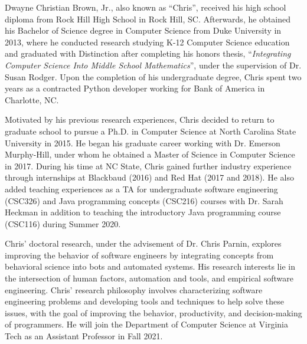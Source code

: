 \begin{biography}
Dwayne Christian Brown, Jr., also known as ``Chris'', received his high school diploma from Rock Hill High School in Rock Hill, SC. Afterwards, he obtained his Bachelor of Science degree in Computer Science from Duke University in 2013, where he conducted research studying K-12 Computer Science education and graduated with Distinction after completing his honors thesis, ``\textit{Integrating Computer Science Into Middle School Mathematics}'', under the supervision of Dr. Susan Rodger. Upon the completion of his undergraduate degree, Chris spent two years as a contracted Python developer working for Bank of America in Charlotte, NC. 

Motivated by his previous research experiences, Chris decided to return to graduate school to pursue a Ph.D. in Computer Science at North Carolina State University in 2015. He began his graduate career working with Dr. Emerson Murphy-Hill, under whom he obtained a Master of Science in Computer Science in 2017. During his time at NC State, Chris gained further industry experience through internships at Blackbaud (2016) and Red Hat (2017 and 2018). He also added teaching experiences as a TA for undergraduate software engineering (CSC326) and Java programming concepts (CSC216) courses with Dr. Sarah Heckman in addition to teaching the introductory Java programming course (CSC116) during Summer 2020. 

Chris' doctoral research, under the advisement of Dr. Chris Parnin, explores improving the behavior of software engineers by integrating concepts from behavioral science into bots and automated systems. His research interests lie in the intersection of human factors, automation and tools, and empirical software engineering. Chris' research philosophy involves characterizing software engineering problems and developing tools and techniques to help solve these issues, with the goal of improving the behavior, productivity, and decision-making of programmers. He will join the Department of Computer Science at Virginia Tech as an Assistant Professor in Fall 2021.

\end{biography}

